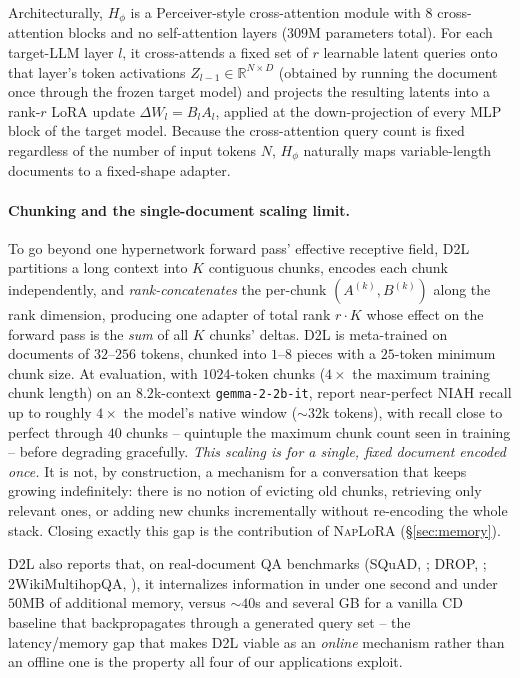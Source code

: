 \documentclass[11pt]{article}
\newcommand{\DTL}{D2L}
\newcommand{\naplora}{\textsc{NapLoRA}}
\newcommand{\mt}[1]{\texttt{\small #1}}
\begin{document}
Architecturally, $H_\phi$ is a Perceiver-style \citep{jaegle2021perceiver} cross-attention module with $8$ cross-attention blocks and no self-attention layers ($309$M parameters total). For each target-LLM layer $l$, it cross-attends a fixed set of $r$ learnable latent queries onto that layer's token activations $Z_{l-1}\in\mathbb{R}^{N\times D}$ (obtained by running the document once through the frozen target model) and projects the resulting latents into a rank-$r$ LoRA update $\Delta W_l = B_lA_l$, applied at the down-projection of every MLP block of the target model. Because the cross-attention query count is fixed regardless of the number of input tokens $N$, $H_\phi$ naturally maps variable-length documents to a fixed-shape adapter.

\paragraph{Chunking and the single-document scaling limit.} To go beyond one hypernetwork forward pass' effective receptive field, \DTL{} partitions a long context into $K$ contiguous chunks, encodes each chunk independently, and \emph{rank-concatenates} the per-chunk $(A^{(k)},B^{(k)})$ along the rank dimension, producing one adapter of total rank $r\!\cdot\!K$ whose effect on the forward pass is the \emph{sum} of all $K$ chunks' deltas. \DTL{} is meta-trained on documents of $32$--$256$ tokens, chunked into $1$--$8$ pieces with a $25$-token minimum chunk size. At evaluation, with $1024$-token chunks ($4\times$ the maximum training chunk length) on an $8.2$k-context \mt{gemma-2-2b-it}, \citet{charakorn2026doctolora} report near-perfect NIAH recall up to roughly $4\times$ the model's native window ($\sim\!32$k tokens), with recall close to perfect through $40$ chunks -- quintuple the maximum chunk count seen in training -- before degrading gracefully. \emph{This scaling is for a single, fixed document encoded once.} It is not, by construction, a mechanism for a conversation that keeps growing indefinitely: there is no notion of evicting old chunks, retrieving only relevant ones, or adding new chunks incrementally without re-encoding the whole stack. Closing exactly this gap is the contribution of \naplora{} (\S\ref{sec:memory}).

\DTL{} also reports that, on real-document QA benchmarks (SQuAD, \citealp{rajpurkar2016squad}; DROP, \citealp{dua2019drop}; 2WikiMultihopQA, \citealp{ho2020wikimultihop}), it internalizes information in under one second and under $50$MB of additional memory, versus $\sim\!40$s and several GB for a vanilla CD baseline that backpropagates through a generated query set -- the latency/memory gap that makes \DTL{} viable as an \emph{online} mechanism rather than an offline one is the property all four of our applications exploit.
\end{document}
